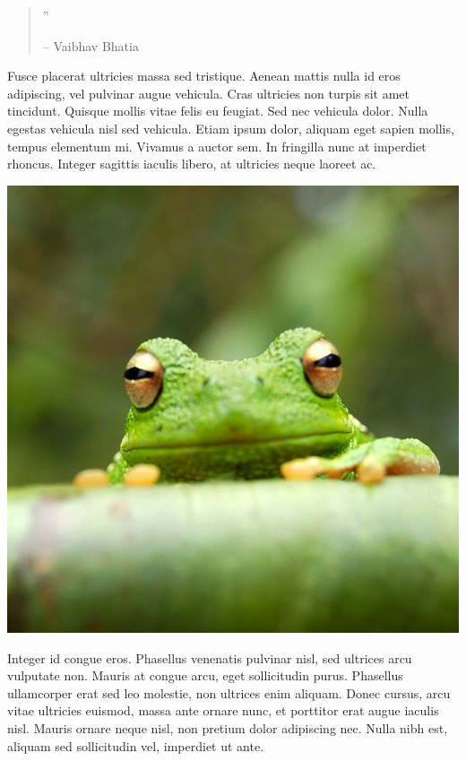 \documentclass[10pt,a4paper]{article}
\begin{document}
\begin{multicols}{2}
\begin{quotation}
\hfill{\Huge''}

\hfill-- Vaibhav Bhatia
\end{quotation}

Fusce placerat ultricies massa sed tristique. Aenean mattis nulla id eros adipiscing, vel pulvinar augue vehicula. Cras ultricies non turpis sit amet tincidunt. Quisque mollis vitae felis eu feugiat. Sed nec vehicula dolor. Nulla egestas vehicula nisl sed vehicula. Etiam ipsum dolor, aliquam eget sapien mollis, tempus elementum mi. Vivamus a auctor sem. In fringilla nunc at imperdiet rhoncus. Integer sagittis iaculis libero, at ultricies neque laoreet ac.

\begin{center}
\includegraphics[width=0.8\linewidth]{frog.jpg} %
\end{center}

Integer id congue eros. Phasellus venenatis pulvinar nisl, sed ultrices arcu vulputate non. Mauris at congue arcu, eget sollicitudin purus. Phasellus ullamcorper erat sed leo molestie, non ultrices enim aliquam. Donec cursus, arcu vitae ultricies euismod, massa ante ornare nunc, et porttitor erat augue iaculis nisl. Mauris ornare neque nisl, non pretium dolor adipiscing nec. Nulla nibh est, aliquam sed sollicitudin vel, imperdiet ut ante.

\end{multicols}

\newpage


\end{document}
